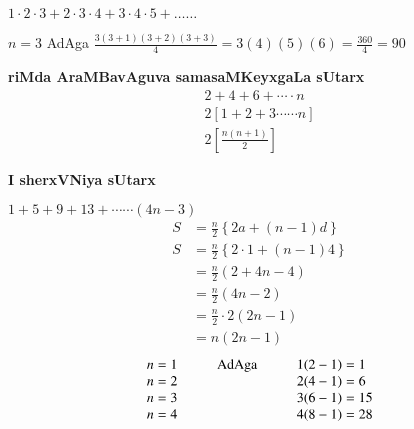 $1 \cdot 2 \cdot 3 +2 \cdot 3 \cdot 4+ 3 \cdot 4 \cdot 5 +\ldots\ldots $

\medskip
$n=3$ AdAga $\frac{3(3+1)(3+2)(3+3)}{4} = 3(4)(5)(6)=\frac{360}{4}=90$

\textbf{ riMda AraMBavAguva samasaMKeyxgaLa sUtarx}
\begin{gather*}
2+4+6+ \cdots\cdot n\\
2[1+2+3\cdots\cdots n]\\
2\left[\frac{n(n+1)}{2}\right]
\end{gather*}

\textbf{I sherxVNiya sUtarx}

$1+5+9+13+ \cdots\cdots (4n-3)$
\begin{align*}
S &=\frac{n}{2}\left\{2a+(n-1)d\right\}\\
S &=\frac{n}{2}\left\{2\cdot 1 +(n-1)4\right\}\\
  &=\frac{n}{2}\left( 2 +4n-4\right)\\
  &=\frac{n}{2}(4n-2)\\
  &=\frac{n}{2}\cdot 2(2n -1)\\
  &=n(2n-1)
\end{align*}
$$
\begin{array}{c@{\hspace{1cm}}c@{\hspace{1cm}}l}
n=1 & \text{AdAga} & 1(2-1)=1\\
n=2 &              & 2(4-1)=6\\
n=3 &              & 3(6-1)=15\\
n=4 &              & 4(8-1)=28
\end{array}
$$
